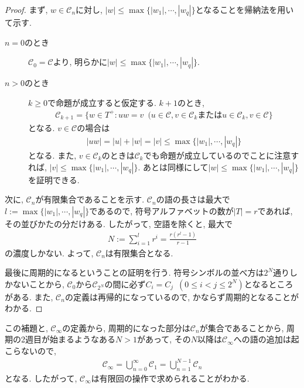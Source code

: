 \documentclass[12pt]{ltjsarticle}
\begin{document}
\begin{proof}
  まず, $w \in \mathcal{C}_n$に対し, $|w| \leq \max \{|w_1|, \cdots, |w_q|\}$となることを帰納法を用いて示す.
  \begin{description}
    \item[$n = 0$のとき]
      $\mathcal{C}_0 = \mathcal{C}$より, 明らかに$|w| \leq \max \{|w_1|, \cdots, |w_q|\}$.
    \item[$n > 0$のとき]
      $k \geq 0$で命題が成立すると仮定する.
      $k + 1$のとき,
      \begin{align*}
        \mathcal{C}_{k + 1} = \{w \in T^+ : uw = v \enspace (u \in \mathcal{C}, v \in \mathcal{C}_k \text{または} u \in \mathcal{C}_k, v \in \mathcal{C}\}
      \end{align*}
      となる.
      $v \in \mathcal{C}$の場合は
      \begin{align*}
        |uw| = |u| + |w| = |v| \leq \max \{|w_1|, \cdots, |w_q|\}
      \end{align*}
      となる.
      また, $v \in \mathcal{C}_k$のときは$\mathcal{C}_k$でも命題が成立しているのでことに注意すれば, $|v| \leq \max \{|w_1|, \cdots, |w_q|\}$.
      あとは同様にして$|w| \leq \max \{|w_1|, \cdots, |w_q|\}$を証明できる.
  \end{description}

  次に, $\mathcal{C}_n$が有限集合であることを示す.
  $\mathcal{C}_n$の語の長さは最大で$l := \max \{|w_1|, \cdots, |w_q|\}$であるので,
  符号アルファベットの数が$|T| = r$であれば, その並びかたの分だけある.
  したがって, 空語を除くと, 最大で
  \begin{align*}
    N := \sum_{i = 1}^l r^i = \frac{r(r^l - 1)}{r - 1}
  \end{align*}
  の濃度しかない.
  よって, $\mathcal{C}_n$は有限集合となる.

  最後に周期的になるということの証明を行う.
  符号シンボルの並べ方は$2^N$通りしかないことから,
  $\mathcal{C}_0$から$\mathcal{C}_{2^N}$の間に必ず$C_i = C_j \enspace (0 \leq i < j \leq 2^N)$となるところがある.
  また, $\mathcal{C}_n$の定義は再帰的になっているので, かならず周期的となることがわかる.
\end{proof}
\noindent
この補題と, $\mathcal{C}_\infty$の定義から, 周期的になった部分は$\mathcal{C}_n$が集合であることから,
周期の2週目が始まるようなある$N > 1$があって, その$N$以降は$\mathcal{C}_\infty$への語の追加は起こらないので,
\begin{align*}
  \mathcal{C}_\infty = \bigcup_{n = 0}^\infty \mathcal{C}_1 = \bigcup_{n = 1}^{N - 1} \mathcal{C}_n
\end{align*}
となる.
したがって, $\mathcal{C}_\infty$は有限回の操作で求められることがわかる.
\end{document}
